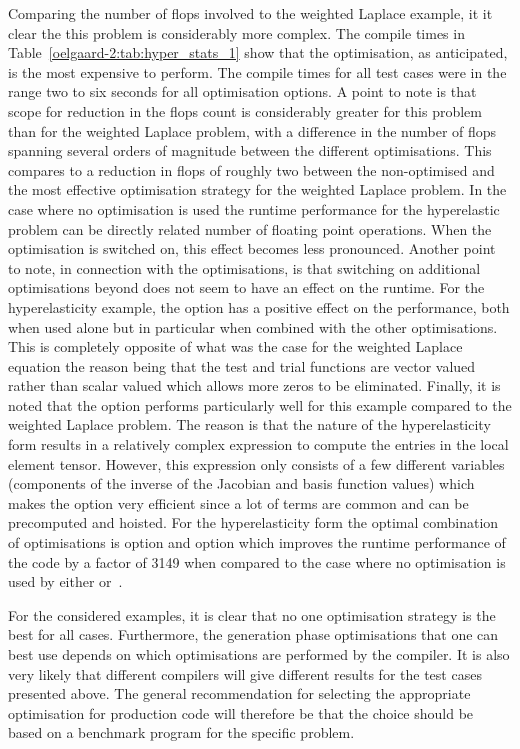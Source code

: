 %
Comparing the number of flops involved to the weighted Laplace example,
it it clear the this problem is considerably more complex.
The \ffc{} compile times in Table~\ref{oelgaard-2:tab:hyper_stats_1} show
that the  optimisation, as anticipated, is the most expensive to
perform.
The  compile times for all test cases were in the range two to six
seconds for all optimisation options.
A point to note is that scope for reduction in the flops count is considerably
greater for this problem than for the weighted Laplace problem,
with a difference in the number of flops spanning
several orders of magnitude between the different \ffc{} optimisations.
This compares to a reduction in flops of roughly two between
the non-optimised and the most effective optimisation strategy for the
weighted Laplace problem.
In the case where no  optimisation is used the runtime performance
for the hyperelastic problem
can be directly related number of floating point operations.
When the  optimisation  is switched on, this effect becomes
less pronounced.
Another point to note, in connection with the  optimisations, is that
switching on additional optimisations beyond 
does not seem to have an effect on the runtime.
For the hyperelasticity example, the option  has a positive effect
on the performance, both when used alone but in particular when combined with
the other \ffc{} optimisations.
This is completely opposite of what was the case for the weighted Laplace
equation the reason being that the test and trial functions are vector valued
rather than scalar valued which allows more zeros to be eliminated.
Finally, it is noted that the  option performs particularly well
for this example compared to the weighted Laplace problem.
The reason is that the nature of the hyperelasticity form results in a
relatively complex expression to compute the entries in the local element
tensor.
However, this expression only consists of a few different variables
(components of the inverse of the Jacobian and basis function values) which
makes the  option very efficient since a lot of terms are common
and can be precomputed and hoisted.
For the hyperelasticity form the optimal combination of optimisations is \ffc{}
option  and  option  which
improves the runtime performance of the code by a factor of 3149 when compared
to the case where no optimisation is used by either \ffc{} or~.

For the considered examples, it is clear that no one
optimisation strategy is the best for all cases.
Furthermore, the generation phase optimisations that one can best use
depends on which
optimisations are performed by the  compiler.
It is also very likely that different  compilers will give different
results for the test cases presented above.
The general recommendation for selecting the appropriate optimisation for
production code will therefore be that the choice should be based on a
benchmark program for the specific problem.
%
